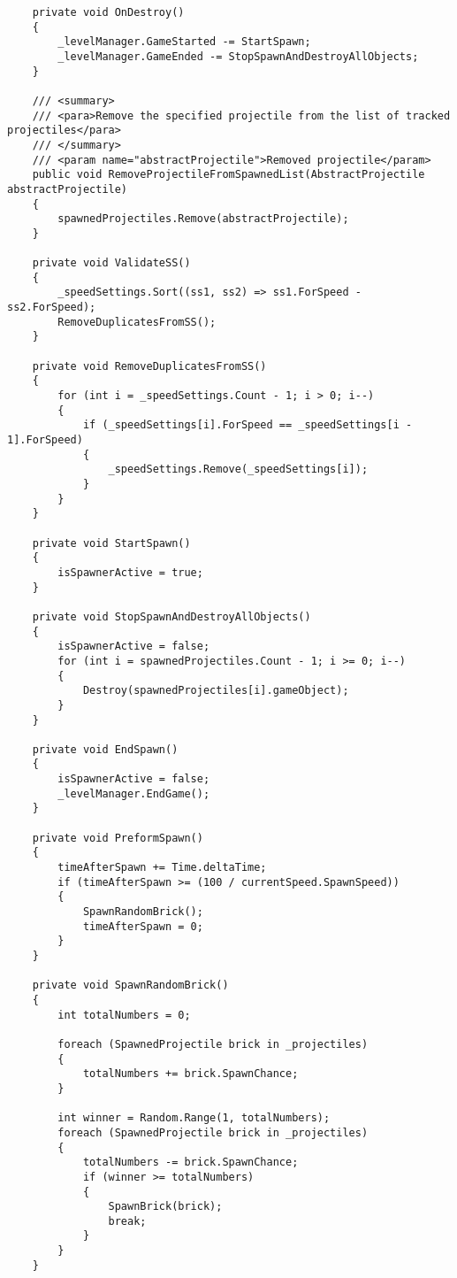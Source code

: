 \begin{verbatim}
    private void OnDestroy()
    {
        _levelManager.GameStarted -= StartSpawn;
        _levelManager.GameEnded -= StopSpawnAndDestroyAllObjects;
    }

    /// <summary>
    /// <para>Remove the specified projectile from the list of tracked projectiles</para>
    /// </summary>
    /// <param name="abstractProjectile">Removed projectile</param>
    public void RemoveProjectileFromSpawnedList(AbstractProjectile abstractProjectile)
    {
        spawnedProjectiles.Remove(abstractProjectile);
    }

    private void ValidateSS()
    {
        _speedSettings.Sort((ss1, ss2) => ss1.ForSpeed - ss2.ForSpeed);
        RemoveDuplicatesFromSS();
    }

    private void RemoveDuplicatesFromSS()
    {
        for (int i = _speedSettings.Count - 1; i > 0; i--)
        {
            if (_speedSettings[i].ForSpeed == _speedSettings[i - 1].ForSpeed)
            {
                _speedSettings.Remove(_speedSettings[i]);
            }
        }
    }

    private void StartSpawn()
    {
        isSpawnerActive = true;
    }

    private void StopSpawnAndDestroyAllObjects()
    {
        isSpawnerActive = false;
        for (int i = spawnedProjectiles.Count - 1; i >= 0; i--)
        {
            Destroy(spawnedProjectiles[i].gameObject);
        }
    }

    private void EndSpawn()
    {
        isSpawnerActive = false;
        _levelManager.EndGame();
    }

    private void PreformSpawn()
    {
        timeAfterSpawn += Time.deltaTime;
        if (timeAfterSpawn >= (100 / currentSpeed.SpawnSpeed))
        {
            SpawnRandomBrick();
            timeAfterSpawn = 0;
        }
    }

    private void SpawnRandomBrick()
    {
        int totalNumbers = 0;

        foreach (SpawnedProjectile brick in _projectiles)
        {
            totalNumbers += brick.SpawnChance;
        }

        int winner = Random.Range(1, totalNumbers);
        foreach (SpawnedProjectile brick in _projectiles)
        {
            totalNumbers -= brick.SpawnChance;
            if (winner >= totalNumbers)
            {
                SpawnBrick(brick);
                break;
            }
        }
    }


\end{verbatim}
